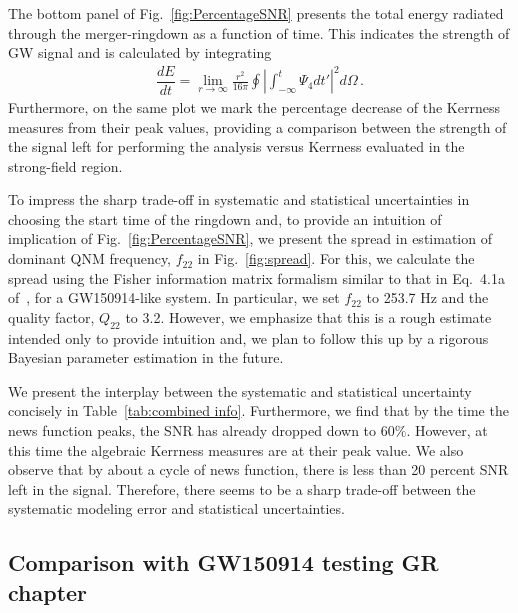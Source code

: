 The bottom panel of Fig.~\ref{fig:PercentageSNR} presents the total energy radiated through the merger-ringdown as a function of time. This indicates the strength of GW signal and is calculated by integrating~\cite{Ruiz:2007yx}
\begin{align}
\label{eq:EnergyRad}
\dfrac{dE}{dt} = \lim_{r \to \infty} \frac{r^2}{16 \pi} \oint \left| {\int_{-\infty}^t \Psi_4 dt'}\right|^2 d \Omega \,.
\end{align}
Furthermore, on the same plot we mark the percentage decrease of the Kerrness measures from their peak values, providing a comparison between the strength of the signal left for performing the analysis versus Kerrness evaluated in the strong-field region. 

To impress the sharp trade-off in systematic and statistical uncertainties in choosing the start time of the ringdown and, to provide an intuition of implication of Fig.~\ref{fig:PercentageSNR}, we present the spread in estimation of dominant QNM frequency,  $f_{22}$ in Fig.~\ref{fig:spread}. For this, we calculate the spread using the Fisher information matrix formalism similar to that in Eq.~4.1a of~\cite{bertiparam}, for a GW150914-like system. In particular, we set $f_{22}$ to 253.7 Hz and the quality factor, $Q_{22}$ to 3.2. However, we emphasize that this is a rough estimate intended only to provide intuition and, we plan to follow this up by a rigorous Bayesian parameter estimation in the future.   



We present the interplay between the systematic and statistical uncertainty concisely in Table~\ref{tab:combined info}. 
Furthermore, we find that by the time the news function peaks, the SNR has already dropped down to $60 \%$. However, at this time the algebraic Kerrness measures are at their peak value. We also observe that by about a cycle of news function, there is less than 20 percent SNR left in the signal. Therefore, there seems to be a sharp trade-off between the systematic modeling error and statistical uncertainties.





\subsection{Comparison with GW150914 testing GR chapter }
\label{sec:TestingGRComparison}

